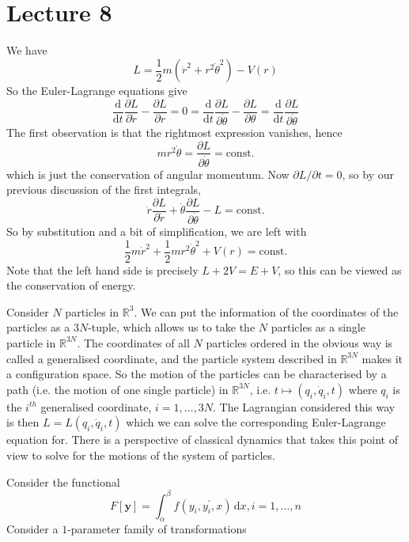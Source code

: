 \documentclass{article}
\begin{document}
\part*{Lecture 8}
\begin{example}
    We have
    $$L=\frac{1}{2}m(\dot{r}^2+r^2\dot{\theta}^2)-V(r)$$
    So the Euler-Lagrange equations give
    $$\frac{\mathrm d}{\mathrm dt}\frac{\partial L}{\partial \dot{r}}-\frac{\partial L}{\partial r}=0=\frac{\mathrm d}{\mathrm dt}\frac{\partial L}{\partial \dot{\theta}}-\frac{\partial L}{\partial \theta}=\frac{\mathrm d}{\mathrm dt}\frac{\partial L}{\partial \dot{\theta}}$$
    The first observation is that the rightmost expression vanishes, hence
    $$mr^2\dot{\theta}=\frac{\partial L}{\partial\dot{\theta}}=\text{const.}$$
    which is just the conservation of angular momentum.
    Now $\partial L/\partial t=0$, so by our previous discussion of the first integrals,
    $$\dot{r}\frac{\partial L}{\partial \dot{r}}+\dot{\theta}\frac{\partial L}{\partial\dot{\theta}}-L=\text{const.}$$
    So by substitution and a bit of simplification, we are left with
    $$\frac{1}{2}m\dot{r}^2+\frac{1}{2}mr^2\dot{\theta}^2+V(r)=\text{const.}$$
    Note that the left hand side is precisely $L+2V=E+V$, so this can be viewed as the conservation of energy.
\end{example}
\begin{example}
    Consider $N$ particles in $\mathbb R^3$.
    We can put the information of the coordinates of the particles as a $3N$-tuple, which allows us to take the $N$ particles as a single particle in $\mathbb R^{3N}$.
    The coordinates of all $N$ particles ordered in the obvious way is called a generalised coordinate, and the particle system described in $\mathbb R^{3N}$ makes it a configuration space.
    So the motion of the particles can be characterised by a path (i.e. the motion of one single particle) in $\mathbb R^{3N}$, i.e. $t\mapsto (q_i,\dot{q}_i,t)$ where $q_i$ is the $i^{th}$ generalised coordinate, $i=1,\ldots,3N$.
    The Lagrangian considered this way is then $L=L(q_i,\dot{q}_i,t)$ which we can solve the corresponding Euler-Lagrange equation for.
    There is a perspective of classical dynamics that takes this point of view to solve for the motions of the system of particles.
\end{example}
Consider the functional
$$F[\mathbf{y}]=\int_\alpha^\beta f(y_i,y_i^\prime,x)\,\mathrm dx,i=1,\ldots,n$$
Consider a $1$-parameter family of transformations
\end{document}
